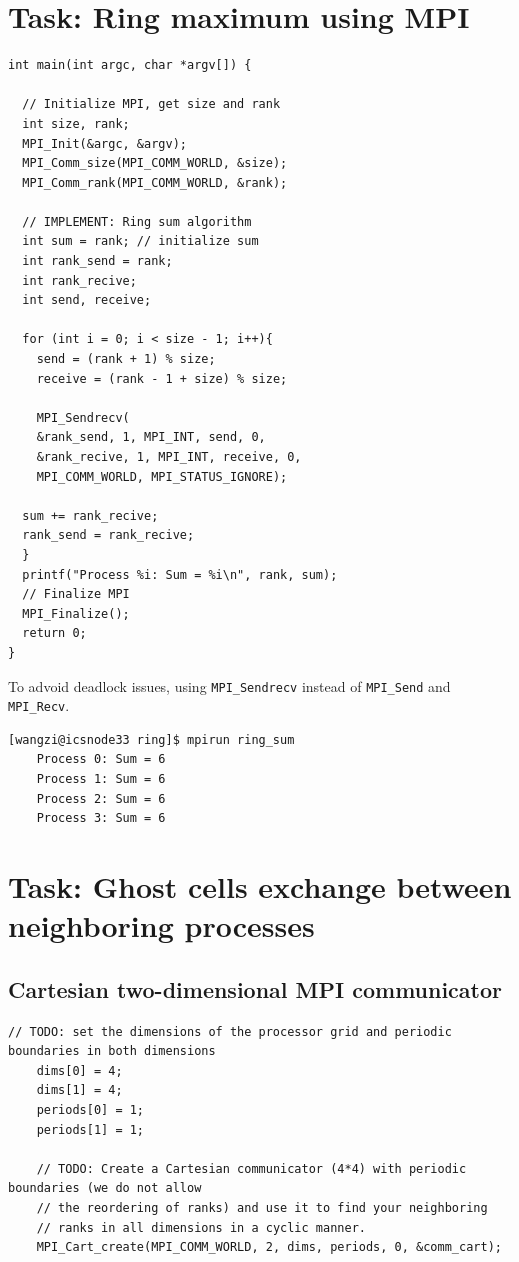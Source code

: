 \documentclass[unicode,11pt,a4paper,oneside,numbers=endperiod,openany]{scrartcl}
\begin{document}
\setassignment

\newline

\assignmentpolicy



\section{Task: Ring maximum using MPI}
\begin{lstlisting}[language=MyC++, style=mystyle, caption={Ring sum function}]
  int main(int argc, char *argv[]) {

  // Initialize MPI, get size and rank
  int size, rank;
  MPI_Init(&argc, &argv);
  MPI_Comm_size(MPI_COMM_WORLD, &size);
  MPI_Comm_rank(MPI_COMM_WORLD, &rank);

  // IMPLEMENT: Ring sum algorithm
  int sum = rank; // initialize sum
  int rank_send = rank;
  int rank_recive;
  int send, receive;

  for (int i = 0; i < size - 1; i++){
    send = (rank + 1) % size;
    receive = (rank - 1 + size) % size;

    MPI_Sendrecv(
    &rank_send, 1, MPI_INT, send, 0, 
    &rank_recive, 1, MPI_INT, receive, 0, 
    MPI_COMM_WORLD, MPI_STATUS_IGNORE);

  sum += rank_recive;
  rank_send = rank_recive;
  }
  printf("Process %i: Sum = %i\n", rank, sum);
  // Finalize MPI
  MPI_Finalize();
  return 0;
}
\end{lstlisting}
To advoid deadlock issues, using \texttt{MPI\_Sendrecv} instead of \texttt{MPI\_Send} and \texttt{MPI\_Recv}.
\begin{lstlisting}[style=mystyle, language=MyBash, caption={Output of the Ring Program}]
    [wangzi@icsnode33 ring]$ mpirun ring_sum
    Process 0: Sum = 6
    Process 1: Sum = 6
    Process 2: Sum = 6
    Process 3: Sum = 6
\end{lstlisting}

\section{Task: Ghost cells exchange between neighboring processes}
\subsection{Cartesian two-dimensional MPI communicator}
\begin{lstlisting}[style=mystyle, language=MyC++, caption={Creating a Cartesian Communicator with Periodic Boundaries}]
    // TODO: set the dimensions of the processor grid and periodic boundaries in both dimensions
    dims[0] = 4;
    dims[1] = 4;
    periods[0] = 1;
    periods[1] = 1;

    // TODO: Create a Cartesian communicator (4*4) with periodic boundaries (we do not allow
    // the reordering of ranks) and use it to find your neighboring
    // ranks in all dimensions in a cyclic manner.
    MPI_Cart_create(MPI_COMM_WORLD, 2, dims, periods, 0, &comm_cart);
\end{lstlisting}
\end{document}
